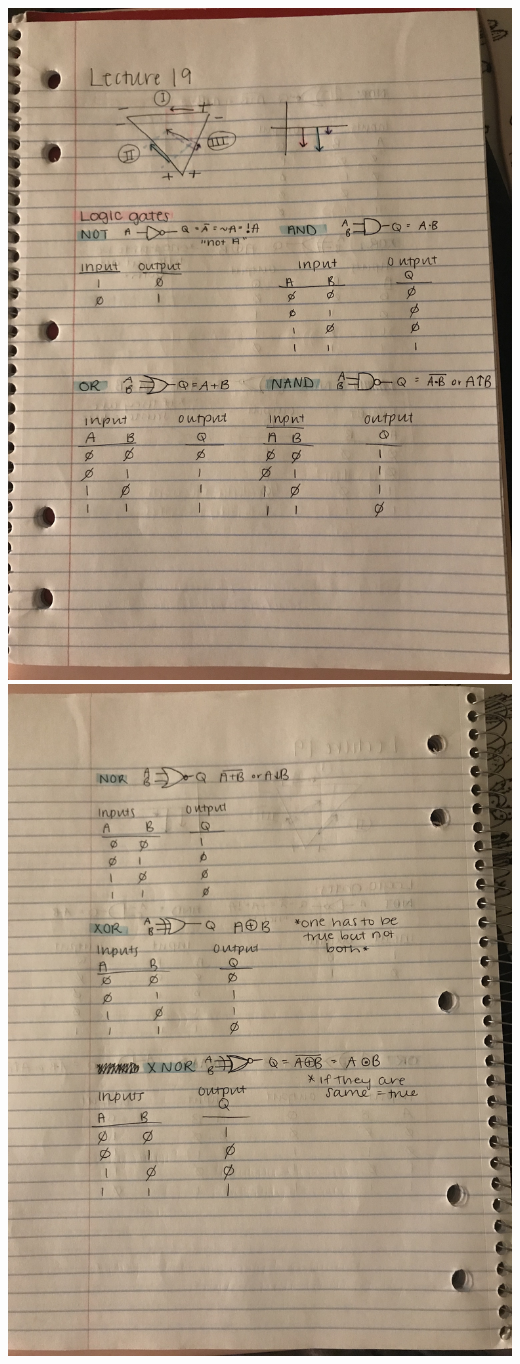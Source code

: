 \documentclass[11pt]{book}
\begin{document}
\\
\includegraphics[width=\textwidth]{figures/notes1.jpg}
\\
\includegraphics[width=\textwidth]{figures/notes2.jpg}
\end{document}
